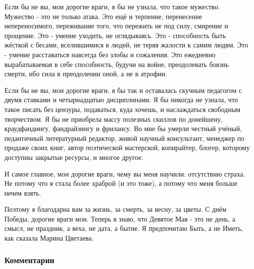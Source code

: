 Если бы не вы, мои дорогие враги, я бы не узнала, что такое мужество. Мужество
- это не только атака. Это ещё и терпение, перенесение непереносимого,
переживание того, что пережить не под силу, смирение и прощение. Это - умение
уходить, не оглядываясь. Это - способность быть жёсткой с бесами, вселившимися
в людей, не теряя жалости к самим людям. Это - умение расставаться навсегда без
злобы и сожаления. Это ежедневно вырабатываемая в себе способность, будучи на
войне, преодолевать боязнь смерти, ибо сила в преодолении оной, а не в атрофии.

Если бы не вы, мои дорогие враги, я бы так и оставалась скучным педагогом с
двумя ставками и четырнадцатью дисциплинами. Я бы никогда не узнала, что такое
писать без цензуры, подаваться, куда хочешь, и наслаждаться свободным
творчеством. Я бы не приобрела массу полезных скиллов по донейшену,
краудфандингу, фандрайзингу и фрилансу. Во мне бы умерли честный учёный,
педантичный литературный редактор, живой научный консультант, менеджер по
продаже своих книг, автор поэтической мастерской, копирайтер, блогер, которому
доступны закрытые ресурсы, и многое другое.

И самое главное, мои дорогие враги, чему вы меня научили: отсутствию страха. Не
потому что я стала более храброй (и это тоже), а потому что меня больше нечем
взять. 

Поэтому я благодарна вам за жизнь, за смерть, за весну, за цветы. С днём
Победы, дорогие враги мои. Теперь я знаю, что Девятое Мая - это не день, а
смысл, не праздник, а веха, не дата, а бытие. Я предпочитаю Быть, а не Иметь,
как сказала Марина Цветаева.

\subsubsection{Комментарии}

